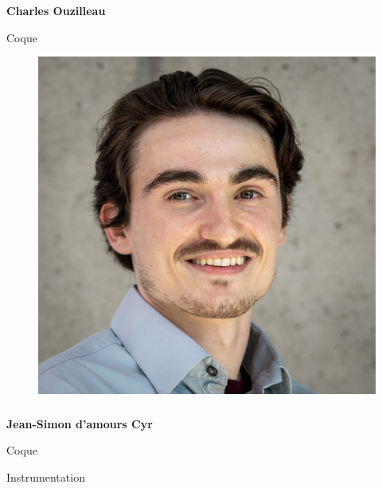 \documentclass[a0paper,portrait]{baposter}
\begin{document}
\begin{poster}
{\subsubsection*{}
\vspace{-2mm}
\textbf{Charles Ouzilleau}

Coque



\begin{figure}
\includegraphics[width=.9\linewidth]{img/membres/Jean-Simon-D'Amours-Cyr-3.jpg} 
\end{figure}
\subsubsection*{}
\vspace{-2mm}
\textbf{Jean-Simon d'amours Cyr}

Coque

Instrumentation


}
\end{poster}
\end{document}
